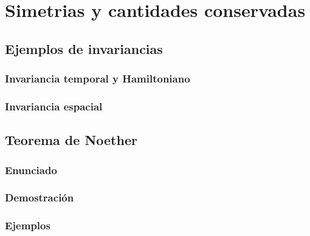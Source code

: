 \chapter{Simetrias y cantidades conservadas}

\section{Ejemplos de invariancias}
\subsection{Invariancia temporal y Hamiltoniano}

\subsection{Invariancia espacial}

\section{Teorema de Noether}
\subsection{Enunciado}
\subsection{Demostración}
\subsection{Ejemplos}
